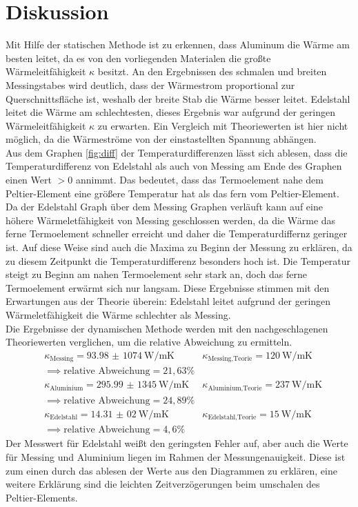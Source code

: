 \section{Diskussion}
Mit Hilfe der statischen Methode ist zu erkennen, dass Aluminum die Wärme am besten leitet, da
es von den vorliegenden Materialen die großte Wärmeleitfähigkeit $\kappa$ besitzt.
An den Ergebnissen des schmalen und breiten Messingstabes wird deutlich, dass der Wärmestrom
proportional zur Querschnittsfläche ist, weshalb der breite Stab die Wärme besser leitet.
Edelstahl leitet die Wärme am schlechtesten, dieses Ergebnis war aufgrund der
geringen Wärmeleitfähigkeit $\kappa$ zu erwarten.
Ein Vergleich mit Theoriewerten ist hier nicht möglich, da die Wärmeströme
von der einstastellten Spannung abhängen.
\\
Aus dem Graphen \ref{fig:diff} der Temperaturdifferenzen lässt sich ablesen, dass
die Temperaturdifferenz von Edelstahl als auch von Messing am Ende des Graphen einen
Wert $>0$ annimmt. Das bedeutet, dass das Termoelement nahe dem Peltier-Element eine größere Temperatur
hat als das fern vom Peltier-Element. Da der Edelstahl Graph über dem Messing Graphen verläuft
kann auf eine höhere Wärmeletfähigkeit von Messing geschlossen werden, da die Wärme das
ferne Termoelement schneller erreicht und daher die Temperaturdiffernz geringer ist.
Auf diese Weise sind auch die Maxima zu Beginn der Messung zu erklären, da zu diesem Zeitpunkt die
Temperaturdifferenz besonders hoch ist. Die Temperatur steigt zu Beginn am nahen Termoelement sehr stark an,
doch das ferne Termoelement erwärmt sich nur langsam.
Diese Ergebnisse stimmen mit den Erwartungen aus der Theorie überein: Edelstahl leitet aufgrund
der geringen Wärmeletfähigkeit die Wärme schlechter als Messing.
\\
Die Ergebnisse der dynamischen Methode werden mit den nachgeschlagenen Theoriewerten verglichen, um
die relative Abweichung zu ermitteln.
\begin{align*}
  &\kappa_{\text{Messing}} =\SI{93,98(1074)}{\W\per\meter\kelvin}   &\kappa_{\text{Messing,Teorie}} =\SI{120}{\W\per\meter\kelvin}\\
  &\implies \text{relative Abweichung}= 21,63\%\\
  &\kappa_{\text{Aluminium}}=\SI{295,99(1345)}{\W\per\meter\kelvin}  &\kappa_{\text{Aluminium,Teorie}} =\SI{237}{\W\per\meter\kelvin}\\
  &\implies \text{relative Abweichung}= 24,89\%\\
  &\kappa_{\text{Edelstahl}}=\SI{14,31(02)}{\W\per\meter\kelvin}   &\kappa_{\text{Edelstahl,Teorie}} =\SI{15}{\W\per\meter\kelvin}\\
  &\implies \text{relative Abweichung}= 4,6\%
\end{align*}
Der Messwert für Edelstahl weißt den geringsten Fehler auf, aber auch die Werte
für Messing und Aluminium liegen im Rahmen der Messungenauigkeit. Diese ist
zum einen durch das ablesen der Werte aus den Diagrammen zu erklären, eine weitere Erklärung sind
die leichten Zeitverzögerungen beim umschalen des Peltier-Elements.



\label{sec:Diskussion}
